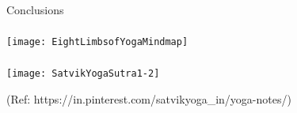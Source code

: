 \begin{frame}[fragile]\frametitle{}
\begin{center}
{\Large Conclusions}
\end{center}
\end{frame}


\begin{frame}[fragile]\frametitle{}

\begin{center}
\texttt{[image: EightLimbsofYogaMindmap]}
\end{center}

\end{frame}

\begin{frame}[fragile]\frametitle{}

\begin{center}
\texttt{[image: SatvikYogaSutra1-2]}

{\tiny (Ref: https://in.pinterest.com/satvikyoga\_in/yoga-notes/)}
\end{center}

\end{frame}